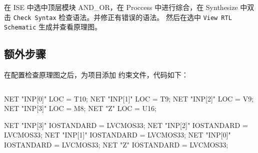\documentclass{ctexart}
\begin{document}
在 ISE 中选中顶层模块 AND\_OR，在 Proccess 中进行综合，在 Synthesize 中双击 
\verb|Check Syntax| 检查语法。并修正有错误的语法。
然后在选中 \verb|View RTL Schematic| 生成并查看原理图。


\subsection{额外步骤}

在配置检查原理图之后，为项目添加 约束文件，代码如下：
\begin{lstlisting}

\end{lstlisting}
NET "INP[0]" LOC = T10;
NET "INP[1]" LOC = T9;
NET "INP[2]" LOC = V9;
NET "INP[3]" LOC = M8;
NET "Z" LOC = U16;

NET "INP[3]" IOSTANDARD = LVCMOS33;
NET "INP[2]" IOSTANDARD = LVCMOS33;
NET "INP[1]" IOSTANDARD = LVCMOS33;
NET "INP[0]" IOSTANDARD = LVCMOS33;
NET "Z" IOSTANDARD = LVCMOS33;
\end{document}

